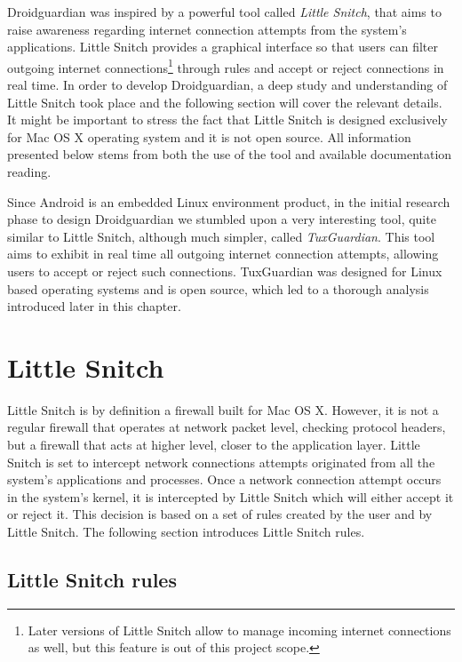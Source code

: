 
Droidguardian was inspired by a powerful tool called \textit{Little Snitch}, that aims to raise awareness regarding internet connection attempts from the system's applications. Little Snitch provides a graphical interface so that users can filter outgoing internet connections\footnote{Later versions of Little Snitch allow to manage incoming internet connections as well, but this feature is out of this project scope.} through rules and accept or reject connections in real time. In order to develop Droidguardian, a deep study and understanding of Little Snitch took place and the following section will cover the relevant details. It might be important to stress the fact that Little Snitch is designed exclusively for Mac OS X operating system and it is not open source. All information presented below stems from both the use of the tool and available documentation reading.

Since Android is an embedded Linux environment product, in the initial research phase to design Droidguardian we stumbled upon a very interesting tool, quite similar to Little Snitch, although much simpler, called \textit{TuxGuardian}. This tool aims to exhibit in real time all outgoing internet connection attempts, allowing users to accept or reject such connections. TuxGuardian was designed for Linux based operating systems and is open source, which led to a thorough analysis introduced later in this chapter.

\section{Little Snitch}
\label{sec:little_snitch}

Little Snitch\cite{Page:LittleSnitch} is by definition a firewall built for Mac OS X. However, it is not a regular firewall that operates at network packet level, checking protocol headers, but a firewall that acts at higher level, closer to the application layer. Little Snitch is set to intercept network connections attempts originated from all the system's applications and processes. Once a network connection attempt occurs in the system's kernel, it is intercepted by Little Snitch which will either accept it or reject it. This decision is based on a set of rules created by the user and by Little Snitch. The following section introduces Little Snitch rules.

\subsection{Little Snitch rules}

